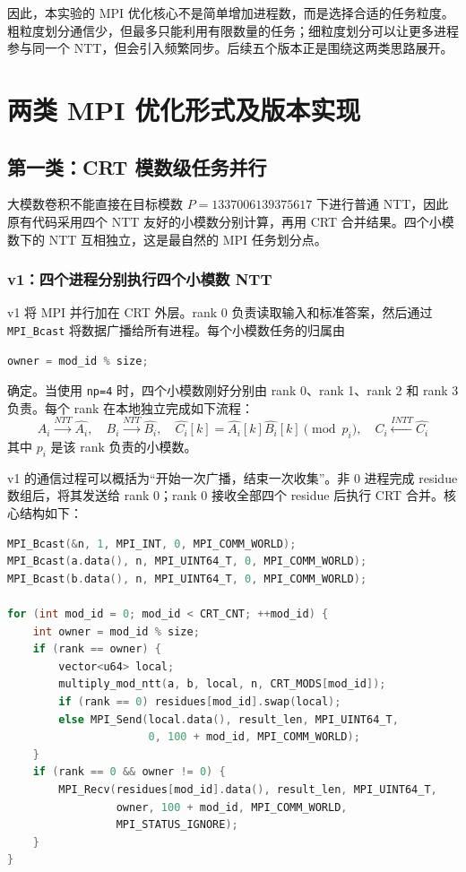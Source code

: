 \documentclass[a4paper]{article}
\begin{document}
因此，本实验的 MPI 优化核心不是简单增加进程数，而是选择合适的任务粒度。粗粒度划分通信少，但最多只能利用有限数量的任务；细粒度划分可以让更多进程参与同一个 NTT，但会引入频繁同步。后续五个版本正是围绕这两类思路展开。

\section{两类 MPI 优化形式及版本实现}

\subsection{第一类：CRT 模数级任务并行}

大模数卷积不能直接在目标模数 $P=1337006139375617$ 下进行普通 NTT，因此原有代码采用四个 NTT 友好的小模数分别计算，再用 CRT 合并结果。四个小模数下的 NTT 互相独立，这是最自然的 MPI 任务划分点。

\subsubsection{v1：四个进程分别执行四个小模数 NTT}

v1 将 MPI 并行加在 CRT 外层。rank 0 负责读取输入和标准答案，然后通过 \texttt{MPI\_Bcast} 将数据广播给所有进程。每个小模数任务的归属由
\begin{lstlisting}[language=C++]
owner = mod_id % size;
\end{lstlisting}
确定。当使用 \texttt{np=4} 时，四个小模数刚好分别由 rank 0、rank 1、rank 2 和 rank 3 负责。每个 rank 在本地独立完成如下流程：
\[
A_i \xrightarrow{NTT} \hat{A_i},\quad
B_i \xrightarrow{NTT} \hat{B_i},\quad
\hat{C_i}[k]=\hat{A_i}[k]\hat{B_i}[k]\pmod {p_i},\quad
C_i \xleftarrow{INTT} \hat{C_i}
\]
其中 $p_i$ 是该 rank 负责的小模数。

v1 的通信过程可以概括为“开始一次广播，结束一次收集”。非 0 进程完成 residue 数组后，将其发送给 rank 0；rank 0 接收全部四个 residue 后执行 CRT 合并。核心结构如下：
\begin{lstlisting}[language=C++,title=v1 的 CRT 模数级 MPI 划分]
MPI_Bcast(&n, 1, MPI_INT, 0, MPI_COMM_WORLD);
MPI_Bcast(a.data(), n, MPI_UINT64_T, 0, MPI_COMM_WORLD);
MPI_Bcast(b.data(), n, MPI_UINT64_T, 0, MPI_COMM_WORLD);

for (int mod_id = 0; mod_id < CRT_CNT; ++mod_id) {
    int owner = mod_id % size;
    if (rank == owner) {
        vector<u64> local;
        multiply_mod_ntt(a, b, local, n, CRT_MODS[mod_id]);
        if (rank == 0) residues[mod_id].swap(local);
        else MPI_Send(local.data(), result_len, MPI_UINT64_T,
                      0, 100 + mod_id, MPI_COMM_WORLD);
    }
    if (rank == 0 && owner != 0) {
        MPI_Recv(residues[mod_id].data(), result_len, MPI_UINT64_T,
                 owner, 100 + mod_id, MPI_COMM_WORLD,
                 MPI_STATUS_IGNORE);
    }
}
\end{lstlisting}
\end{document}
